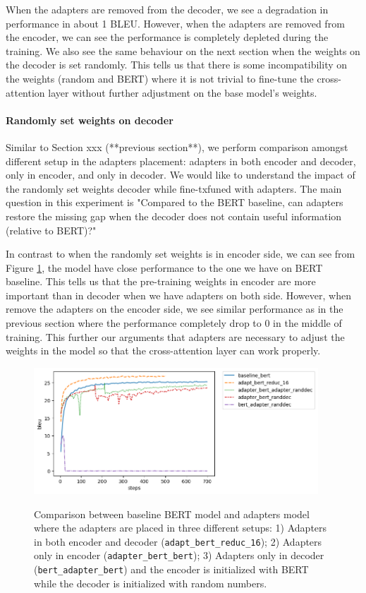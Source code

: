 When the adapters are removed from the decoder, we see a degradation in performance in about 1 BLEU. However, when the adapters are removed from the encoder, we can see the performance is completely depleted during the training. We also see the same behaviour on the next section when the weights on the decoder is set randomly. This tells us that there is some incompatibility on the weights (random and BERT) where it is not trivial to fine-tune the cross-attention layer without further adjustment on the base model's weights.

\paragraph{Randomly set weights on decoder}
Similar to Section xxx (**previous section**), we perform comparison amongst different setup in the adapters placement: adapters in both encoder and decoder, only in encoder, and only in decoder. We would like to understand the impact of the randomly set weights decoder while fine-txfuned with adapters. The main question in this experiment is "Compared to the BERT baseline, can adapters restore the missing gap when the decoder does not contain useful information (relative to BERT)?"

In contrast to when the randomly set weights is in encoder side, we can see from Figure \ref{img:adapt_bert_randdec}, the model have close performance to the one we have on BERT baseline. This tells us that the pre-training weights in encoder are more important than in decoder when we have adapters on both side. However, when remove the adapters on the encoder side, we see similar performance as in the previous section where the performance completely drop to 0 in the middle of training. This further our arguments that adapters are necessary to adjust the weights in the model so that the cross-attention layer can work properly.

\begin{figure}[h]
    {\includegraphics[width=0.95\textwidth]{img/adapter_bert_randdec.png}}
    \centering
    \caption{Comparison between baseline BERT model and adapters model where the adapters are placed in three different setups: 1) Adapters in both encoder and decoder (\texttt{adapt\_bert\_reduc\_16}); 2) Adapters only in encoder (\texttt{adapter\_bert\_bert}); 3) Adapters only in decoder (\texttt{bert\_adapter\_bert}) and the encoder is initialized with BERT while the decoder is initialized with random numbers.}
    \label{img:adapt_bert_randdec}
\end{figure}

